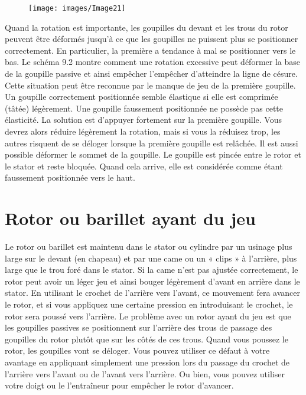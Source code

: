 \documentclass[a4paper,french,11pt,twoside]{report}
\begin{document}
\begin{figure}[ht] \begin{center}
        \texttt{[image: images/Image21]}
        \caption{}
\end{center} \end{figure}


Quand la rotation est importante, les goupilles du devant et les trous du rotor peuvent être déformés jusqu'à ce que les goupilles ne puissent plus se positionner correctement. En particulier, la première a tendance à mal se positionner vers le bas. Le schéma 9.2 montre comment une rotation excessive peut déformer la base de la goupille passive et ainsi empêcher l'empêcher d'atteindre la ligne de césure. Cette situation peut être reconnue par le manque de jeu de la première goupille. Un goupille correctement positionnée semble élastique si elle est comprimée (tâtée) légèrement. Une goupille faussement positionnée ne possède pas cette élasticité. La solution est d'appuyer fortement sur la première goupille. Vous devrez alors réduire légèrement la rotation, mais si vous la réduisez trop, les autres risquent de se déloger lorsque la première goupille est relâchée. Il est aussi possible déformer le sommet de la goupille. Le goupille est pincée entre le rotor et le stator et reste bloquée. Quand cela arrive, elle est considérée comme étant faussement positionnée vers le haut.

\section{Rotor ou barillet ayant du jeu}

Le rotor ou barillet est maintenu dans le stator ou cylindre par un usinage plus large sur le devant (en chapeau) et par une came ou un « clips » à l'arrière, plus large que le trou foré dans le stator. Si la came n'est pas ajustée correctement, le rotor peut avoir un léger jeu et ainsi bouger légèrement d'avant en arrière dans le stator. En utilisant le crochet de l'arrière vers l'avant, ce mouvement fera avancer le rotor, et si vous appliquez une certaine pression en introduisant le crochet, le rotor sera poussé vers l'arrière. Le problème avec un rotor ayant du jeu est que les goupilles passives se positionnent sur l'arrière des trous de passage des goupilles du rotor plutôt que sur les côtés de ces trous. Quand vous poussez le rotor, les goupilles vont se déloger. Vous pouvez utiliser ce défaut à votre avantage en appliquant simplement une pression lors du passage du crochet de l'arrière vers l'avant ou de l'avant vers l'arrière. Ou bien, vous pouvez utiliser votre doigt ou le l'entraîneur pour empêcher le rotor d'avancer.
\end{document}
